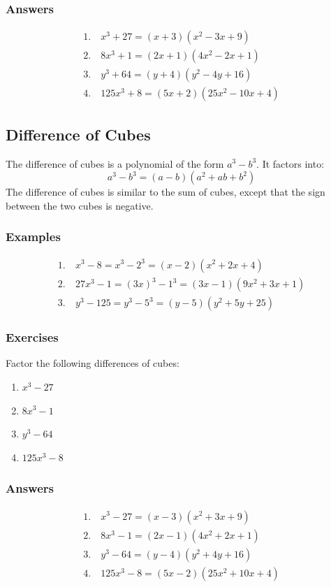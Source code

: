 \documentclass[12pt]{article}
\begin{document}
\subsubsection*{Answers}
\begin{align*}
1.\ & x^3 + 27 = (x + 3)(x^2 - 3x + 9) \\
2.\ & 8x^3 + 1 = (2x + 1)(4x^2 - 2x + 1) \\
3.\ & y^3 + 64 = (y + 4)(y^2 - 4y + 16) \\
4.\ & 125x^3 + 8 = (5x + 2)(25x^2 - 10x + 4)
\end{align*}

\newpage
\subsection*{Difference of Cubes}
The difference of cubes is a polynomial of the form $a^3 - b^3$. It factors into:
\[
a^3 - b^3 = (a - b)(a^2 + ab + b^2)
\]
The difference of cubes is similar to the sum of cubes, except that the sign between the two cubes is negative.

\subsubsection*{ Examples}
\begin{align*}
1.\ & x^3 - 8 = x^3 - 2^3 = (x - 2)(x^2 + 2x + 4) \\
2.\ & 27x^3 - 1 = (3x)^3 - 1^3 = (3x - 1)(9x^2 + 3x + 1) \\
3.\ & y^3 - 125 = y^3 - 5^3 = (y - 5)(y^2 + 5y + 25)
\end{align*}

\subsubsection*{Exercises}
Factor the following differences of cubes:
\begin{multicols}{2}
\begin{enumerate}
    \item $x^3 - 27$
    \item $8x^3 - 1$
    \item $y^3 - 64$
    \item $125x^3 - 8$
\end{enumerate}
\end{multicols}

\subsubsection*{Answers}
\begin{align*}
1.\ & x^3 - 27 = (x - 3)(x^2 + 3x + 9) \\
2.\ & 8x^3 - 1 = (2x - 1)(4x^2 + 2x + 1) \\
3.\ & y^3 - 64 = (y - 4)(y^2 + 4y + 16) \\
4.\ & 125x^3 - 8 = (5x - 2)(25x^2 + 10x + 4)
\end{align*}
\end{document}
